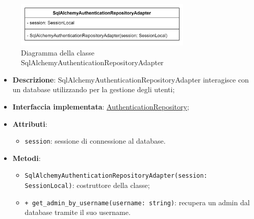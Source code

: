  \label{SqlAlchemyAuthenticationRepositoryAdapter}
\begin{figure}[H]
    \centering
    \includegraphics[width=0.75\textwidth]{assets/Backend/sql_alchemy_authentication_repository_adapter.png}
    \caption{Diagramma della classe SqlAlchemyAuthenticationRepositoryAdapter}
  \end{figure}
\begin{itemize}
    \item \textbf{Descrizione}: SqlAlchemyAuthenticationRepositoryAdapter interagisce con un database utilizzando  per la gestione degli utenti;
    \item \textbf{Interfaccia implementata}: \hyperref[AuthenticationRepository]{AuthenticationRepository};
    \item \textbf{Attributi}:
    \begin{itemize}
        \item \texttt{session}: sessione di connessione al database.
    \end{itemize}
    \item \textbf{Metodi}:
    \begin{itemize}
        \item \texttt{SqlAlchemyAuthenticationRepositoryAdapter(session: SessionLocal)}: costruttore della classe;
        \item \texttt{+ get\_admin\_by\_username(username: string)}: recupera un admin dal database tramite il suo username.
    \end{itemize}
\end{itemize} 

